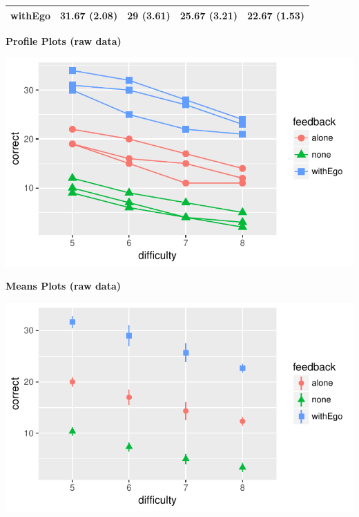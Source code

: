 \documentclass[]{article}
\begin{document}
\begin{longtable}[]{@{}ccccc@{}}
\begin{minipage}[t]{0.13\columnwidth}\centering\strut
withEgo\strut
\end{minipage} & \begin{minipage}[t]{0.18\columnwidth}\centering\strut
31.67 (2.08)\strut
\end{minipage} & \begin{minipage}[t]{0.17\columnwidth}\centering\strut
29 (3.61)\strut
\end{minipage} & \begin{minipage}[t]{0.18\columnwidth}\centering\strut
25.67 (3.21)\strut
\end{minipage} & \begin{minipage}[t]{0.18\columnwidth}\centering\strut
22.67 (1.53)\strut
\end{minipage}\tabularnewline
\bottomrule
\end{longtable}

\textbf{Profile Plots (raw data)}

\begin{center}\includegraphics{Unit_5_assignment_SKELETON_R__spr18__files/figure-latex/unnamed-chunk-60-1} \end{center}

\textbf{Means Plots (raw data)}

\begin{center}\includegraphics{Unit_5_assignment_SKELETON_R__spr18__files/figure-latex/unnamed-chunk-61-1} \end{center}
\end{document}
